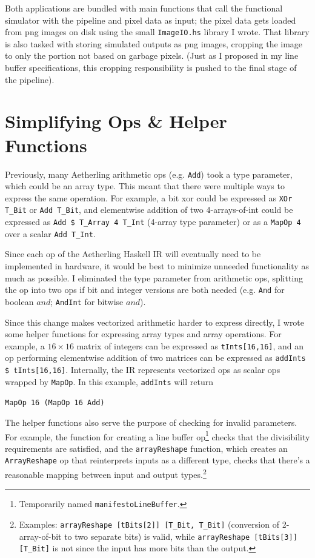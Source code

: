 \documentclass[12pt]{article}
\begin{document}
Both applications are bundled with main functions that call the
functional simulator with the pipeline and pixel data as input; the
pixel data gets loaded from png images on disk using the small
\texttt{ImageIO.hs} library I wrote. That library is also tasked with
storing simulated outputs as png images, cropping the image to only
the portion not based on garbage pixels. (Just as I proposed in my
line buffer specifications, this cropping responsibility is pushed to
the final stage of the pipeline).

\section{Simplifying Ops \& Helper Functions}

Previously, many Aetherling arithmetic ops (e.g. \texttt{Add}) took a
type parameter, which could be an array type. This meant that there
were multiple ways to express the same operation. For example, a bit
xor could be expressed as \texttt{XOr T\_Bit} or \texttt{Add T\_Bit},
and elementwise addition of two 4-arrays-of-int could be expressed as
\texttt{Add \$ T\_Array 4 T\_Int} (4-array type parameter) or as a
\texttt{MapOp 4} over a scalar \texttt{Add T\_Int}.

Since each op of the Aetherling Haskell IR will eventually need to be
implemented in hardware, it would be best to minimize unneeded
functionality as much as possible. I eliminated the type parameter
from arithmetic ops, splitting the op into two ops if bit and integer
versions are both needed (e.g. \texttt{And} for boolean $and$;
\texttt{AndInt} for bitwise $and$).

Since this change makes vectorized arithmetic harder to express
directly, I wrote some helper functions for expressing array types and
array operations. For example, a $16\times 16$ matrix of integers can
be expressed as \texttt{tInts[16,16]}, and an op performing
elementwise addition of two matrices can be expressed as
\texttt{addInts \$ tInts[16,16]}. Internally, the IR represents
vectorized ops as scalar ops wrapped by \texttt{MapOp}.
In this example, \texttt{addInts} will return

\texttt{MapOp 16 (MapOp 16 Add)}

The helper functions also serve the purpose of checking for invalid
parameters. For example, the function for creating a line buffer
op\footnote{Temporarily named \texttt{manifestoLineBuffer}.} checks that the
divisibility requirements are satisfied, and the \texttt{arrayReshape}
function, which creates an \texttt{ArrayReshape} op that reinterprets
inputs as a different type, checks that there's a reasonable mapping
between input and output types.\footnote{
Examples: \texttt{arrayReshape [tBits[2]] [T\_Bit, T\_Bit]} (conversion of
2-array-of-bit to two separate bits) is valid, while
\texttt{arrayReshape [tBits[3]] [T\_Bit]} is not since the input has
more bits than the output.}
\end{document}
